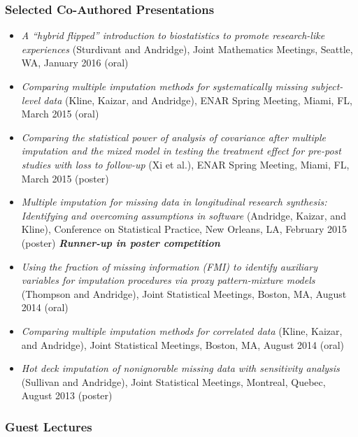 \documentclass[
  english,
  letterpaper,
  DIV=11,
  numbers=noendperiod]{scrartcl}
\providecommand{\tightlist}{%
  \setlength{\itemsep}{0pt}\setlength{\parskip}{0pt}}
\begin{document}
\subsubsection{Selected Co-Authored
Presentations}\label{selected-co-authored-presentations}

\begin{itemize}
\tightlist
\item
  \emph{A ``hybrid flipped'' introduction to biostatistics to promote
  research-like experiences} (Sturdivant and Andridge), Joint
  Mathematics Meetings, Seattle, WA, January 2016 (oral)
\item
  \emph{Comparing multiple imputation methods for systematically missing
  subject-level data} (Kline, Kaizar, and Andridge), ENAR Spring
  Meeting, Miami, FL, March 2015 (oral)
\item
  \emph{Comparing the statistical power of analysis of covariance after
  multiple imputation and the mixed model in testing the treatment
  effect for pre-post studies with loss to follow-up} (Xi et al.), ENAR
  Spring Meeting, Miami, FL, March 2015 (poster)
\item
  \emph{Multiple imputation for missing data in longitudinal research
  synthesis: Identifying and overcoming assumptions in software}
  (Andridge, Kaizar, and Kline), Conference on Statistical Practice, New
  Orleans, LA, February 2015 (poster) \textbf{\emph{Runner-up in poster
  competition}}
\item
  \emph{Using the fraction of missing information (FMI) to identify
  auxiliary variables for imputation procedures via proxy
  pattern-mixture models} (Thompson and Andridge), Joint Statistical
  Meetings, Boston, MA, August 2014 (oral)
\item
  \emph{Comparing multiple imputation methods for correlated data}
  (Kline, Kaizar, and Andridge), Joint Statistical Meetings, Boston, MA,
  August 2014 (oral)
\item
  \emph{Hot deck imputation of nonignorable missing data with
  sensitivity analysis} (Sullivan and Andridge), Joint Statistical
  Meetings, Montreal, Quebec, August 2013 (poster)
\end{itemize}

\subsubsection{Guest Lectures}\label{guest-lectures}
\end{document}
